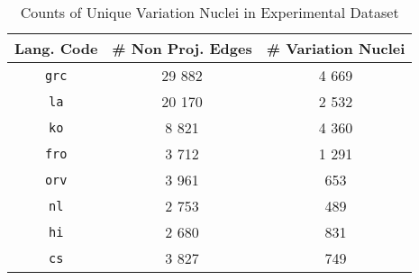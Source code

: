\begin{table}[H]
    \centering
    \begin{tabular}{|c|c|c|}
    \hline
    \textbf{Lang. Code} & \textbf{\# Non Proj. Edges} & \textbf{\# Variation Nuclei} \\
    \hline
    \texttt{grc} & 29 882 & 4 669 \\
    \texttt{la} & 20 170 & 2 532 \\
    \texttt{ko} & 8 821 & 4 360 \\
    \texttt{fro} & 3 712 & 1 291 \\
    \texttt{orv} & 3 961 & 653 \\
    \texttt{nl} & 2 753 & 489 \\
    \texttt{hi} & 2 680 & 831 \\
    \texttt{cs} & 3 827 & 749 \\
    \hline
    \end{tabular}
    \caption{Counts of Unique Variation Nuclei in Experimental Dataset}
    \label{tab:nucleicounts}
\end{table}

